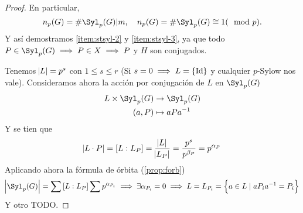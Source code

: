 \begin{proof}
    En particular, 
    \[
        n_p(G) = \# \Syl_p(G) \vert m, \quad n_p(G) = \# \Syl_p(G) \cong 1 (\mod p).
    \]
    Y así demostramos \ref{item:stsyl-2} y \ref{item:stsyl-3}, ya que todo $P \in \Syl_p(G) \implies
    P \in X \implies P$ y $H$ son conjugados.

    Tenemos $\abs{L} = p^s$ con $1 \leq s \leq r$ (Si $s = 0 \implies L = \left\{ \operatorname{Id} \right\}$ y cualquier
    $p$-Sylow nos vale). Consideramos ahora la acción por conjugación de $L$ en $\Syl_p(G)$
    \[
        \begin{aligned}
            L \times \Syl_p(G) &\to \Syl_p(G) \\
            (a, P) &\mapsto aPa^{-1}
        \end{aligned}
    \]
    Y se tien que 
    \[
        \abs{L \cdot P} = \left[ L : L_P \right] = \frac{\abs{L}}{\abs{L_P}} = \frac{p^s}{p^{\beta_P}} =
        p^{\alpha_P}
    \]
    Aplicando ahora la fórmula de órbita (\ref{prop:forb})
    \[
        \abs{\Syl_p(G)} = \sum \left[ L : L_P \right] \sum p^{\alpha_{P_i}} \implies
        \exists \alpha_{P_i} = 0 \implies L = L_{P_i} = \left\{ a \in L \mid aP_ia^{-1} = P_i \right\}
    \] Y otro TODO.
\end{proof}
